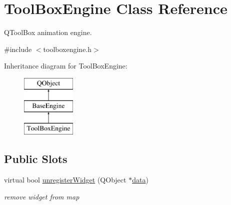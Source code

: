 \hypertarget{class_tool_box_engine}{}\section{Tool\+Box\+Engine Class Reference}
\label{class_tool_box_engine}


Q\+Tool\+Box animation engine.  




{\ttfamily \#include $<$toolboxengine.\+h$>$}

Inheritance diagram for Tool\+Box\+Engine\+:\begin{figure}[H]
\begin{center}
\leavevmode
\includegraphics[height=3.000000cm]{class_tool_box_engine}
\end{center}
\end{figure}
\subsection*{Public Slots}
\begin{DoxyCompactItemize}
\item 
\mbox{\label{class_tool_box_engine_a8663c23b315f2a061f77e4fbdf5a2b7a}} 
virtual bool \hyperlink{class_tool_box_engine_a8663c23b315f2a061f77e4fbdf5a2b7a}{unregister\+Widget} (Q\+Object $\ast$\hyperlink{class_tool_box_engine_a6c031c13cc4bf34656771d08c4c3985a}{data})
\begin{DoxyCompactList}\small\item\em remove widget from map \end{DoxyCompactList}\end{DoxyCompactItemize}
